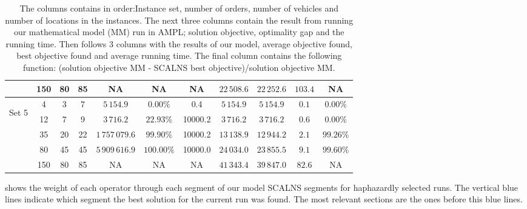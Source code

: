 \documentclass[../main.tex]{subfiles}
\begin{document}
\begin{table}
\begin{adjustbox}{width=0.95\columnwidth,center}
\begin{tabular}{|cccc|ccc|ccc|c|}
                        & 150     & 80    & 85    & NA              & NA            & NA        & $22\,508.6$   & $22\,252.6$   & $103.4$   & NA  \\
            \hline
                \multirow{5}{*}{\begin{sideways} Set 5 \end{sideways}}  
                        & 4       & 3     & 7     & $5\,154.9$      & $0.00\%$      & 0.4       & $5\,154.9$    & $5\,154.9$    & $0.1$     & $0.00\%$  \\
                        & 12      & 7     & 9     & $3\,716.2$      & $22.93\%$     & 10000.2   & $3\,716.2$    & $3\,716.2$    & $0.6$     & $0.00\%$  \\
                        & 35      & 20    & 22    & $1\,757\,079.6$ & $99.90\%$     & 10000.2   & $13\,138.9$   & $12\,944.2$   & $2.1$     & $99.26\%$  \\
                        & 80      & 45    & 45    & $5\,909\,616.9$ & $100.00\%$    & 10000.0   & $24\,034.0$   & $23\,855.5$   & $9.1$     & $99.60\%$  \\
                        & 150     & 80    & 85    & NA              & NA            & NA        & $41\,343.4$   & $39\,847.0$   & $82.6$    & NA  \\
            \hline
            \end{tabular}
    \end{adjustbox}
    \label{tab:finRes}
    \caption*{The columns contains in order:Instance set, number of orders, number of vehicles and number of locations in the instances. 
    The next three columns contain the result from running our mathematical model (MM) run in AMPL; solution objective, optimality gap and the running time.
    Then follows 3 columns with the results of our model, average objective found, best objective found and average running time. 
    The final column contains the following function: (solution objective MM - SCALNS best objective)/solution objective MM.}
\end{table}

 shows the weight of each operator through each segment of our model SCALNS segments for haphazardly selected runs. 
The vertical blue lines indicate which segment the best solution for the current run was found. The most relevant sections are the ones before this blue lines.
\end{document}
